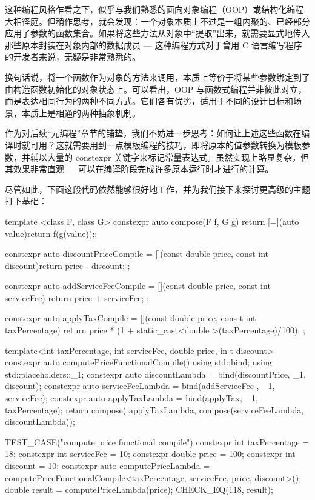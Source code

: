 这种编程风格乍看之下，似乎与我们熟悉的面向对象编程（OOP）或结构化编程大相径庭。但稍作思考，就会发现：一个对象本质上不过是一组内聚的、已经部分应用了参数的函数集合。如果将这些方法从对象中“提取”出来，就需要显式地传入那些原本封装在对象内部的数据成员 --- 这种编程方式对于曾用 C 语言编写程序的开发者来说，无疑是非常熟悉的。

换句话说，将一个函数作为对象的方法来调用，本质上等价于将某些参数绑定到了由构造函数初始化的对象状态上。可以看出，OOP 与函数式编程并非彼此对立，而是表达相同行为的两种不同方式。它们各有优劣，适用于不同的设计目标和场景，本质上是相通的两种抽象机制。

作为对后续“元编程”章节的铺垫，我们不妨进一步思考：如何让上述这些函数在编译时就可用？这就需要用到一点模板编程的技巧，即将原本的值参数转换为模板参数，并辅以大量的 constexpr 关键字来标记常量表达式。虽然实现上略显复杂，但其效果非常直观 --- 可以在编译阶段完成许多原本运行时才进行的计算。

尽管如此，下面这段代码依然能够很好地工作，并为我们接下来探讨更高级的主题打下基础：

\begin{cpp}
template <class F, class G>
constexpr auto compose(F f, G g){
  return [=](auto value){return f(g(value));};
}

constexpr auto discountPriceCompile = 
[](const double price, const
int discount){return price - discount;
};

constexpr auto addServiceFeeCompile = 
[](const double price, const
int serviceFee){ 
  return price + serviceFee; 
};

constexpr auto applyTaxCompile = 
[](const double price,
cons t int taxPercentage){ 
  return price * (1 + static_cast<double >(taxPercentage)/100); 
};

template<int taxPercentage, int serviceFee, double price, in t
discount>
constexpr auto computePriceFunctionalCompile() {
  using std::bind;
  using std::placeholders::_1;
  constexpr auto discountLambda = bind(discountPrice, _1, discount);
  constexpr auto serviceFeeLambda = bind(addServiceFee , _1, serviceFee);
  constexpr auto applyTaxLambda = bind(applyTax, _1, taxPercentage);
  return compose( applyTaxLambda, compose(serviceFeeLambda, discountLambda));
}

TEST_CASE("compute price functional compile"){
  constexpr int taxPercentage = 18;
  constexpr int serviceFee = 10;
  constexpr double price = 100;
  constexpr int discount = 10;
  constexpr auto computePriceLambda =
  computePriceFunctionalCompile<taxPercentage, serviceFee, price,
  discount>();
  double result = computePriceLambda(price);
  CHECK_EQ(118, result);
}
\end{cpp}

